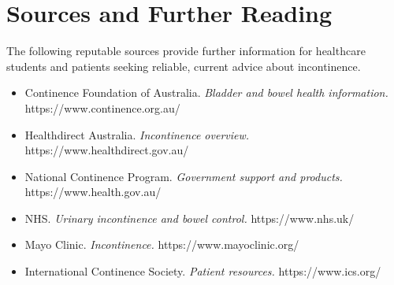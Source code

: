 \section*{Sources and Further Reading}
The following reputable sources provide further information for healthcare students and patients seeking reliable, current advice about incontinence.
\begin{itemize}
    \item Continence Foundation of Australia. \textit{Bladder and bowel health information.} https://www.continence.org.au/
    \item Healthdirect Australia. \textit{Incontinence overview.} https://www.healthdirect.gov.au/
    \item National Continence Program. \textit{Government support and products.} https://www.health.gov.au/
    \item NHS. \textit{Urinary incontinence and bowel control.} https://www.nhs.uk/
    \item Mayo Clinic. \textit{Incontinence.} https://www.mayoclinic.org/
    \item International Continence Society. \textit{Patient resources.} https://www.ics.org/
\end{itemize}
